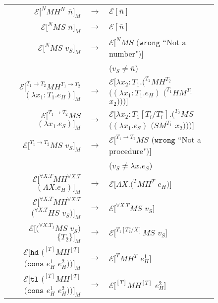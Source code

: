 \begin{figure}
\onehalfspacing
\begin{center}
\begin{tabular}{rcl}
$\mathscr{E}[^{N}MH^{N}$ $\overline{n}]_{M}$ & $\rightarrow$ & $\mathscr{E}[\overline{n}]$ \\
$\mathscr{E}[^{N}MS$ $\overline{n}]_{M}$ & $\rightarrow$ & $\mathscr{E}[\overline{n}]$ \\
$\mathscr{E}[^{N}MS$ $v_{S}]_{M}$ & $\rightarrow$ & $\mathscr{E}[^{N}MS$ $(\mathtt{wrong}$ ``Not a number"$)]$ \\
&& ($v_{S}\neq\overline{n}$) \\
$\mathscr{E}[^{T_{1}\rightarrow T_{2}}MH^{T_{1}\rightarrow T_{2}}$ $(\lambda x_{1}:T_{1}.e_{H})]_{M}$ & $\rightarrow$ & $\mathscr{E}[\lambda x_{2}:T_{1}.(^{T_{2}}MH^{T_{2}}$ $((\lambda x_{1}:T_{1}.e_{H})$ $(^{T_{1}}HM^{T_{1}}$ $x_{2})))]$ \\
$\mathscr{E}[^{T_{1}\rightarrow T_{2}}MS$ $(\lambda x_{1}.e_{S})]_{M}$ & $\rightarrow$ & $\mathscr{E}[\lambda x_{2}:T_{1}[T_{i}/T^{a}_{i}].(^{T_{2}}MS$ $((\lambda x_{1}.e_{S})$ $(SM^{T_{1}}$ $x_{2})))]$ \\
$\mathscr{E}[^{T_{1}\rightarrow T_{2}}MS$ $v_{S}]_{M}$ & $\rightarrow$ & $\mathscr{E}[^{T_{1}\rightarrow T_{2}}MS$ $(\mathtt{wrong}$ ``Not a procedure"$)]$ \\
&& ($v_{S}\neq\lambda x.e_{S}$) \\
$\mathscr{E}[^{\forall X.T}MH^{\forall X.T}$ $(\Lambda X.e_{H})]_{M}$ & $\rightarrow$ & $\mathscr{E}[\Lambda X.(^{T}MH^{T}$ $e_{H})]$ \\
$\mathscr{E}[^{\forall X.T}MH^{\forall X.T}$ $(^{\forall X.T}HS$ $v_{S})]_{M}$ & $\rightarrow$ & $\mathscr{E}[^{\forall X.T}MS$ $v_{S}]$ \\
$\mathscr{E}[(^{\forall X.T_{1}}MS$ $v_{S})$ $\lbrace T_{2}\rbrace]_{M}$ & $\rightarrow$ & $\mathscr{E}[^{T_{1}[T^{a}_{2}/X]}MS$ $v_{S}]$ \\
$\mathscr{E}[\mathtt{hd}$ $(^{[T]}MH^{[T]}$ $(\mathtt{cons}$ $e_{H}^{1}$ $e_{H}^{2}))]_{M}$ & $\rightarrow$ & $\mathscr{E}[^{T}MH^{T}$ $e_{H}^{1}]$ \\
$\mathscr{E}[\mathtt{tl}$ $(^{[T]}MH^{[T]}$ $(\mathtt{cons}$ $e_{H}^{1}$ $e_{H}^{2}))]_{M}$ & $\rightarrow$ & $\mathscr{E}[^{[T]}MH^{[T]}$ $e_{H}^{2}]$ \\

\end{tabular}
\end{center}
\end{figure}

